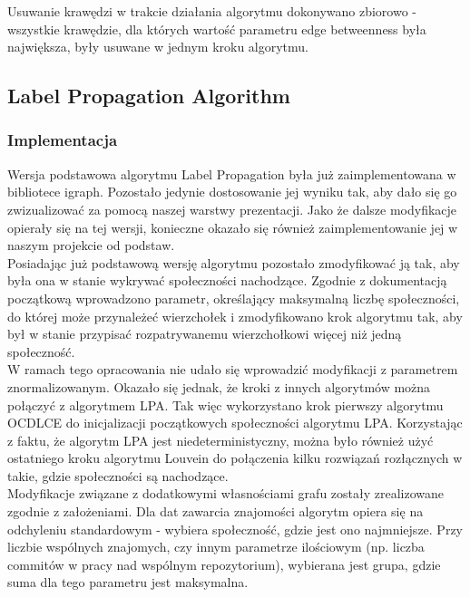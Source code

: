 \documentclass{article}
\begin{document}
Usuwanie krawędzi w trakcie działania algorytmu dokonywano zbiorowo - wszystkie krawędzie, dla których wartość parametru edge betweenness była największa, były usuwane w jednym kroku algorytmu.\\

\subsection{Label Propagation Algorithm}
\subsubsection{Implementacja}

Wersja podstawowa algorytmu Label Propagation była już zaimplementowana w bibliotece igraph. Pozostało jedynie dostosowanie jej wyniku tak, aby dało się go zwizualizować za pomocą naszej warstwy prezentacji. Jako że dalsze modyfikacje opierały się na tej wersji, konieczne okazało się również zaimplementowanie jej w naszym projekcie od podstaw.\\

Posiadając już podstawową wersję algorytmu pozostało zmodyfikować ją tak, aby była ona w stanie wykrywać społeczności nachodzące. Zgodnie z dokumentacją początkową wprowadzono parametr, określający maksymalną liczbę społeczności, do której może przynależeć wierzchołek i zmodyfikowano krok algorytmu tak, aby był w stanie przypisać rozpatrywanemu wierzchołkowi więcej niż jedną społeczność.\\

W ramach tego opracowania nie udało się wprowadzić modyfikacji z parametrem znormalizowanym. Okazało się jednak, że kroki z innych algorytmów można połączyć z algorytmem LPA. Tak więc wykorzystano krok pierwszy algorytmu OCDLCE do inicjalizacji początkowych społeczności algorytmu LPA. Korzystając z faktu, że algorytm LPA jest niedeterministyczny, można było również użyć ostatniego kroku algorytmu Louvein do połączenia kilku rozwiązań rozłącznych w takie, gdzie społeczności są nachodzące.\\

Modyfikacje związane z dodatkowymi własnościami grafu zostały zrealizowane zgodnie z założeniami. Dla dat zawarcia znajomości algorytm opiera się na odchyleniu standardowym - wybiera społeczność, gdzie jest ono najmniejsze. Przy liczbie wspólnych znajomych, czy innym parametrze ilościowym (np. liczba commitów w pracy nad wspólnym repozytorium), wybierana jest grupa, gdzie suma dla tego parametru jest maksymalna.
\end{document}
